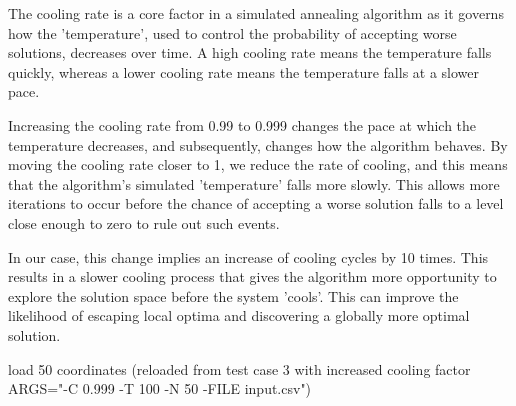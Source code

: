 \documentclass[a4paper,10pt]{article}
\begin{document}
The cooling rate is a core factor in a simulated annealing algorithm as it governs how the 'temperature', used to control the probability of accepting worse solutions, decreases over time. A high cooling rate means the temperature falls quickly, whereas a lower cooling rate means the temperature falls at a slower pace.

Increasing the cooling rate from 0.99 to 0.999 changes the pace at which the temperature decreases, and subsequently, changes how the algorithm behaves. By moving the cooling rate closer to 1, we reduce the rate of cooling, and this means that the algorithm's simulated 'temperature' falls more slowly. This allows more iterations to occur before the chance of accepting a worse solution falls to a level close enough to zero to rule out such events.

In our case, this change implies an increase of cooling cycles by 10 times. This results in a slower cooling process that gives the algorithm more opportunity to explore the solution space before the system 'cools'. This can improve the likelihood of escaping local optima and discovering a globally more optimal solution.

 load 50 coordinates (reloaded from test case 3 with increased cooling factor ARGS="-C 0.999 -T 100 -N 50 -FILE input.csv")
\end{document}
